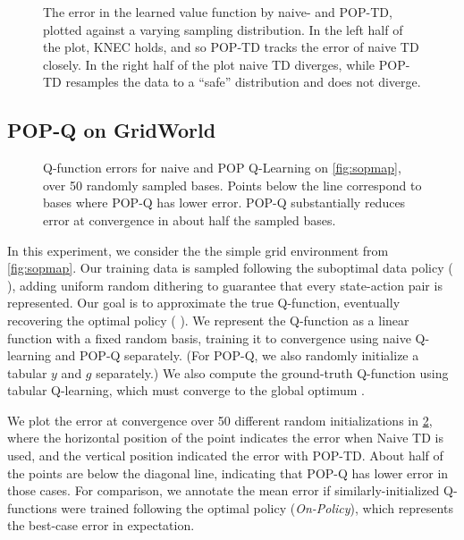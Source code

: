 \label{sec:threestateexp}
\begin{figure}[t]
  \centering
  
  \caption{The error in the learned value function by naive- and POP-TD, plotted against a varying sampling distribution. In the left half of the plot, KNEC holds, and so POP-TD tracks the error of naive TD closely. In the right half of the plot naive TD diverges, while POP-TD resamples the data to a ``safe'' distribution and does not diverge. }
  \label{fig:threestate}
\end{figure}



\subsection{POP-Q on GridWorld}

\label{sec:expsimpleoffpolicy}
\begin{figure}[t]
  \centering
  
  \caption{Q-function errors for naive and POP Q-Learning on \cref{fig:sopmap}, over 50 randomly sampled bases. Points below the line correspond to bases where POP-Q has lower error. POP-Q substantially reduces error at convergence in about half the sampled bases. }
  \label{fig:soperr}
\end{figure}

In this experiment, we consider the the simple grid environment from \cref{fig:sopmap}.
Our training data is sampled following the suboptimal data policy ({\color{datapolicy} \datapolicyglyph}), adding uniform random dithering to guarantee that every state-action pair is represented.
Our goal is to approximate the true Q-function, eventually recovering the optimal policy ({\color{optimpolicy} \optimpolicyglyph}).
We represent the Q-function as a linear function with a fixed random basis, training it to convergence using naive Q-learning and POP-Q separately. (For POP-Q, we also randomly initialize a tabular $y$ and $g$ separately.) We also compute the ground-truth Q-function using tabular Q-learning, which must converge to the global optimum \cite{watkins1992q}.

We plot the error at convergence over 50 different random initializations in \cref{fig:soperr}, where the horizontal position of the point indicates the error when Naive TD is used, and the vertical position indicated the error with POP-TD. About half of the points are below the diagonal line, indicating that POP-Q has lower error in those cases. For comparison, we annotate the mean error if similarly-initialized Q-functions were trained following the optimal policy (\emph{On-Policy}), which represents the best-case error in expectation.

